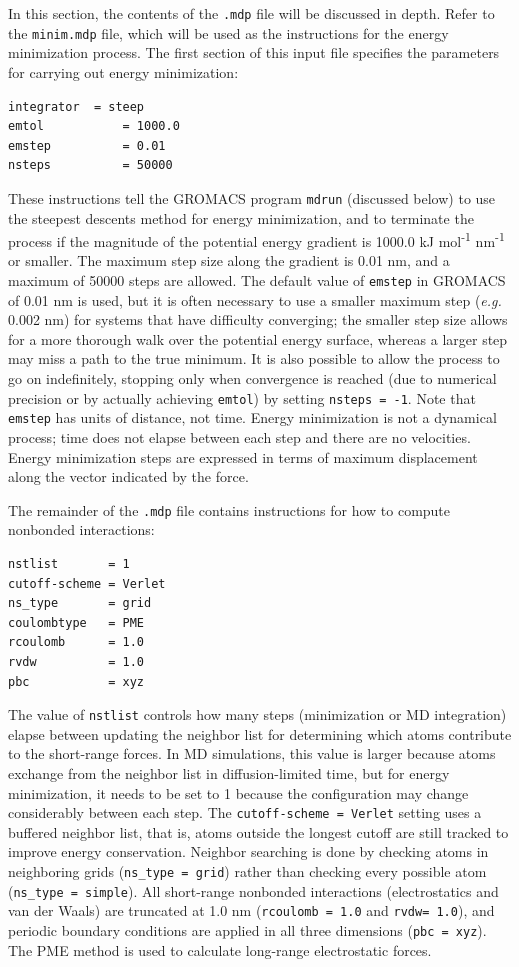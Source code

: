 \documentclass[9pt,tutorial,pubversion]{livecoms}
\begin{document}
In this section, the contents of the \texttt{.mdp} file will be discussed in depth. Refer to the \texttt{minim.mdp} file, which will be used as the instructions for the energy minimization process. The first section of this input file specifies the parameters for carrying out energy minimization:

\begin{lstlisting}
integrator	= steep
emtol           = 1000.0
emstep          = 0.01
nsteps          = 50000
\end{lstlisting}
%
These instructions tell the GROMACS program \texttt{mdrun} (discussed below) to use the steepest descents method for energy minimization, and to terminate the process if the magnitude of the potential energy gradient is 1000.0 kJ mol\textsuperscript{-1} nm\textsuperscript{-1} or smaller. The maximum step size along the gradient is 0.01 nm, and a maximum of 50000 steps are allowed. The default value of \texttt{emstep} in GROMACS of 0.01 nm is used, but it is often necessary to use a smaller maximum step ({\em e.g.} 0.002 nm) for systems that have difficulty converging; the smaller step size allows for a more thorough walk over the potential energy surface, whereas a larger step may miss a path to the true minimum. It is also possible to allow the process to go on indefinitely, stopping only when convergence is reached (due to numerical precision or by actually achieving \texttt{emtol}) by setting \texttt{nsteps = -1}. Note that \texttt{emstep} has units of distance, not time. Energy minimization is not a dynamical process; time does not elapse between each step and there are no velocities. Energy minimization steps are expressed in terms of maximum displacement along the vector indicated by the force.

The remainder of the \texttt{.mdp} file contains instructions for how to compute nonbonded interactions:

\begin{lstlisting}
nstlist       = 1
cutoff-scheme = Verlet
ns_type       = grid
coulombtype   = PME
rcoulomb      = 1.0
rvdw          = 1.0
pbc           = xyz
\end{lstlisting}
%
The value of \texttt{nstlist} controls how many steps (minimization or MD integration) elapse between updating the neighbor list for determining which atoms contribute to the short-range forces. In MD simulations, this value is larger because atoms exchange from the neighbor list in diffusion-limited time, but for energy minimization, it needs to be set to 1 because the configuration may change considerably between each step. The \texttt{cutoff-scheme = Verlet} setting uses a buffered neighbor list, that is, atoms outside the longest cutoff are still tracked to improve energy conservation. Neighbor searching is done by checking atoms in neighboring grids (\texttt{ns\_type = grid}) rather than checking every possible atom (\texttt{ns\_type = simple}). All short-range nonbonded interactions (electrostatics and van der Waals) are truncated at 1.0 nm (\texttt{rcoulomb = 1.0} and \texttt{rvdw= 1.0}), and periodic boundary conditions are applied in all three dimensions (\texttt{pbc = xyz}). The PME method is used to calculate long-range electrostatic forces.
\end{document}
